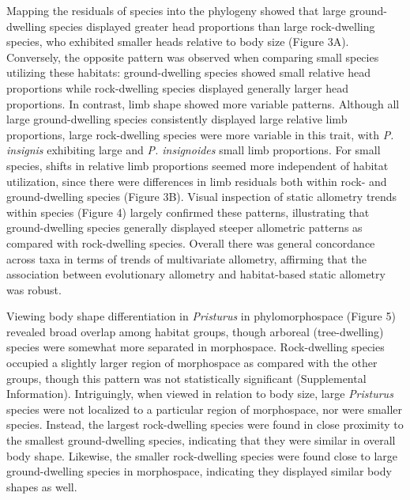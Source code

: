 \documentclass[
  11pt,
]{article}
\begin{document}
Mapping the residuals of species into the phylogeny showed that large
ground-dwelling species displayed greater head proportions than large
rock-dwelling species, who exhibited smaller heads relative to body size
(Figure 3A). Conversely, the opposite pattern was observed when
comparing small species utilizing these habitats: ground-dwelling
species showed small relative head proportions while rock-dwelling
species displayed generally larger head proportions. In contrast, limb
shape showed more variable patterns. Although all large ground-dwelling
species consistently displayed large relative limb proportions, large
rock-dwelling species were more variable in this trait, with \emph{P.
insignis} exhibiting large and \emph{P. insignoides} small limb
proportions. For small species, shifts in relative limb proportions
seemed more independent of habitat utilization, since there were
differences in limb residuals both within rock- and ground-dwelling
species (Figure 3B). Visual inspection of static allometry trends within
species (Figure 4) largely confirmed these patterns, illustrating that
ground-dwelling species generally displayed steeper allometric patterns
as compared with rock-dwelling species. Overall there was general
concordance across taxa in terms of trends of multivariate allometry,
affirming that the association between evolutionary allometry and
habitat-based static allometry was robust. \hfill\break

Viewing body shape differentiation in \emph{Pristurus} in
phylomorphospace (Figure 5) revealed broad overlap among habitat groups,
though arboreal (tree-dwelling) species were somewhat more separated in
morphospace. Rock-dwelling species occupied a slightly larger region of
morphospace as compared with the other groups, though this pattern was
not statistically significant (Supplemental Information). Intriguingly,
when viewed in relation to body size, large \emph{Pristurus} species
were not localized to a particular region of morphospace, nor were
smaller species. Instead, the largest rock-dwelling species were found
in close proximity to the smallest ground-dwelling species, indicating
that they were similar in overall body shape. Likewise, the smaller
rock-dwelling species were found close to large ground-dwelling species
in morphospace, indicating they displayed similar body shapes as well.
\hfill\break 
\end{document}
